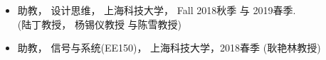 \documentclass[paper=a4,fontsize=11pt]{scrartcl} %
\newlength{\spacebox}
\newcommand{\NewPart}[1]{\section*{\uppercase{#1}}}
\newcommand{\PersonalEntry}[2]{
		\noindent\hangindent=2em\hangafter=0 %
		\parbox{\spacebox}{        %
		\textit{#1}}		       %
		\hspace{1.5em} #2 \par}    %
\newcommand{\SkillsEntry}[2]{      %
		\noindent\hangindent=2em\hangafter=0 %
		\parbox{\spacebox}{        %
		\textit{#1}}			   %
		\hspace{1.5em} #2 \par}    %
\begin{document}
\begin{CJK*}{UTF8}{gbsn}
\begin{itemize}
	\item{助教， 设计思维， 上海科技大学， Fall 2018秋季 与 2019春季.\\ (陆丁教授， 杨锡仪教授 与陈雪教授) }
	
	\item{助教， 信号与系统(EE150)，  上海科技大学，2018春季 (耿艳林教授)
		}


	
\end{itemize}



\end{CJK*}
\end{document}

